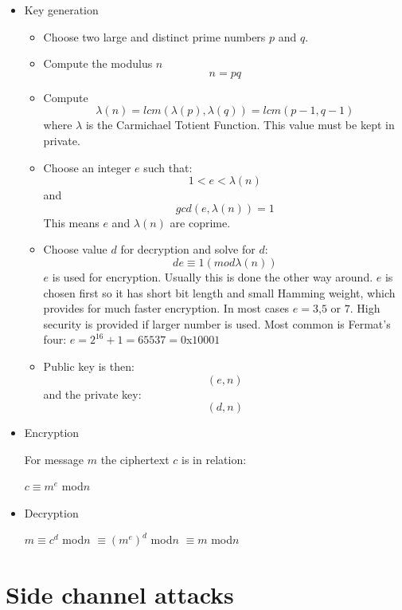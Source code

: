 \documentclass[oneside,openright,12pt,final,en]{mgr}
\begin{document}
\begin{itemize}
	\item Key generation\cite{rsad}
	\begin{itemize}
		\item Choose two large and distinct prime numbers $p$ and $q$.
		\item Compute the modulus $n$
		\[n=pq\]
		\item Compute 
		\[\lambda(n) = lcm(\lambda(p), \lambda(q)) = lcm(p-1, q-1)\]
		where $\lambda$ is the Carmichael Totient Function\cite{lambda}. This value must be kept in private.
		\item Choose an integer $e$ such that:
		\[1 < e < \lambda(n)\] 
		and
		\[gcd(e, \lambda(n)) = 1\]
		This means $e$ and $\lambda(n)$ are coprime.\cite{primes}
		\item Choose value $d$ for decryption and solve for $d$:
		\[de \equiv 1 (mod \lambda(n))\] 
		$e$ is used for encryption. Usually this is done the other way around. $e$ is chosen first so it has short bit length and small Hamming weight,\cite{hamm} which provides for much faster encryption. In most cases $e=3$,$5$ or $7$. High security is provided if larger number is used. Most common is Fermat's four: $e=2^{16}+1=65537 = 0$x$10001$
		\item Public key is then:
		\[(e,n)\]
		and the private key:
		\[(d,n)\]
	\end{itemize}
	\item Encryption
	
	For message $m$ the ciphertext $c$ is in relation:
	\begin{center}
	$c\equiv m^e$ mod$n$
	\end{center}
	\item Decryption
	\begin{center}
		$m\equiv c^d$ mod$n$ $\equiv(m^e)^d$ mod$n$ $\equiv m$ mod$n$
	\end{center}
	
\end{itemize}

\section{Side channel attacks}
\end{document}
